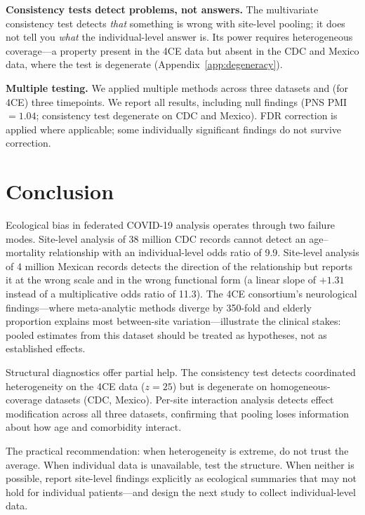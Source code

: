 \documentclass{article}
\begin{document}
\textbf{Consistency tests detect problems, not answers.}  The multivariate
consistency test detects \emph{that} something is wrong with site-level
pooling; it does not tell you \emph{what} the individual-level answer is.
Its power requires heterogeneous coverage---a property present in the 4CE
data but absent in the CDC and Mexico data, where the test is degenerate
(Appendix~\ref{app:degeneracy}).

\textbf{Multiple testing.}  We applied multiple methods across three
datasets and (for 4CE) three timepoints.  We report all results, including
null findings (PNS PMI $= 1.04$; consistency test degenerate on CDC and
Mexico).  FDR correction is applied where applicable; some individually
significant findings do not survive correction.


\section{Conclusion}

Ecological bias in federated COVID-19 analysis operates through two
failure modes.  Site-level analysis of 38 million CDC records cannot detect
an age--mortality relationship with an individual-level odds ratio of 9.9.  Site-level analysis of 4 million Mexican records detects the
direction of the relationship but reports it at the wrong scale and in the
wrong functional form (a linear slope of $+1.31$ instead of a multiplicative
odds ratio of 11.3).  The 4CE consortium's neurological findings---where
meta-analytic methods diverge by 350-fold and elderly proportion explains most
between-site variation---illustrate the clinical stakes: pooled estimates from
this dataset should be treated as hypotheses, not as established effects.

Structural diagnostics offer partial help.  The consistency test detects
coordinated heterogeneity on the 4CE data ($z = 25$) but is degenerate on
homogeneous-coverage datasets (CDC, Mexico).  Per-site interaction analysis
detects effect modification across all three datasets, confirming that
pooling loses information about how age and comorbidity interact.

The practical recommendation: when heterogeneity is extreme, do not trust the
average.  When individual data is unavailable, test the structure.  When
neither is possible, report site-level findings explicitly as ecological
summaries that may not hold for individual patients---and design the next
study to collect individual-level data.
\end{document}
